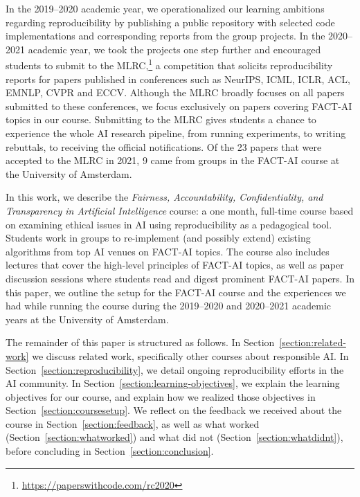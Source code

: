 \documentclass[letterpaper]{article}
\newcommand{\OurUniversity}{the University of Amsterdam}
\begin{document}
In the 2019--2020 academic year, we operationalized our learning ambitions regarding reproducibility by publishing a public repository with selected code implementations and corresponding reports from the group projects.
In the 2020--2021 academic year, we took the projects one step further and encouraged students to submit to the \ac{MLRC},\footnote{\url{https://paperswithcode.com/rc2020}} a competition that solicits reproducibility reports for papers published in conferences such as NeurIPS, ICML, ICLR, ACL, EMNLP, CVPR and ECCV. 
Although the MLRC broadly focuses on all papers submitted to these conferences, we focus exclusively on papers covering FACT-AI topics in our course. 
Submitting to the MLRC gives students a chance to experience the whole AI research pipeline, from running experiments, to writing rebuttals, to receiving the official notifications. 
Of the 23 papers that were accepted to the MLRC in 2021, 9 came from groups in the FACT-AI course at \OurUniversity{}. 

In this work, we describe the \textit{Fairness, Accountability, Confidentiality, and Transparency in Artificial Intelligence} course: a one month, full-time course based on examining ethical issues in AI using reproducibility as a pedagogical tool. 
Students work in groups to re-implement (and possibly extend) existing algorithms from top AI venues on \ac{FACT-AI} topics. 
The course also includes lectures that cover the high-level principles of FACT-AI topics, as well as paper discussion sessions where students read and digest prominent FACT-AI papers. 
In this paper, we outline the setup for the \ac{FACT-AI} course and the experiences we had while running the course during the 2019--2020 and 2020--2021 academic years at \OurUniversity{}. 

The remainder of this paper is structured as follows. 
In Section~\ref{section:related-work} we discuss related work, specifically other courses about responsible AI. 
In Section~\ref{section:reproducibility}, we detail ongoing reproducibility efforts in the AI community. 
In Section~\ref{section:learning-objectives}, we explain the learning objectives for our course, and explain how we realized those objectives in Section~\ref{section:coursesetup}. 
We reflect on the feedback we received about the course in Section~\ref{section:feedback}, as well as what worked (Section~\ref{section:whatworked}) and what did not (Section~\ref{section:whatdidnt}), before concluding in Section~\ref{section:conclusion}. 
\end{document}
